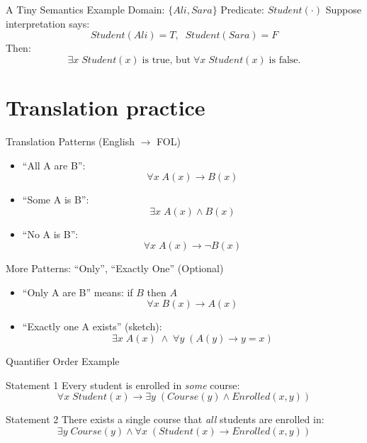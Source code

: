 \documentclass[aspectratio=169]{beamer}
\begin{document}
\begin{frame}{A Tiny Semantics Example}
  Domain: $\{Ali, Sara\}$ \quad Predicate: $Student(\cdot)$
  \vspace{0.4em}
  Suppose interpretation says:
  \[
    Student(Ali)=T,\;\; Student(Sara)=F
  \]
  Then:
  \[
    \exists x\; Student(x)\; \text{is true, but}\; \forall x\; Student(x)\; \text{is false.}
  \]
\end{frame}

\section{Translation practice}
\label{sec:translate}

\begin{frame}{Translation Patterns (English $\rightarrow$ FOL)}
  \begin{itemize}[<+->]
    \item ``All A are B'':
    \[
      \forall x\; A(x) \rightarrow B(x)
    \]
    \item ``Some A is B'':
    \[
      \exists x\; A(x) \land B(x)
    \]
    \item ``No A is B'':
    \[
      \forall x\; A(x) \rightarrow \lnot B(x)
    \]
  \end{itemize}
\end{frame}

\begin{frame}{More Patterns: ``Only'', ``Exactly One'' (Optional)}
  \begin{itemize}[<+->]
    \item ``Only A are B'' means: if $B$ then $A$
    \[
      \forall x\; B(x) \rightarrow A(x)
    \]
    \item ``Exactly one A exists'' (sketch):
    \[
      \exists x\; A(x)\; \land\; \forall y\; (A(y) \rightarrow y=x)
    \]
  \end{itemize}
\end{frame}

\begin{frame}{Quantifier Order Example}
  \begin{block}{Statement 1}
    Every student is enrolled in \emph{some} course:
    \[
      \forall x\; Student(x) \rightarrow \exists y\; (Course(y) \land Enrolled(x,y))
    \]
  \end{block}
  \vspace{0.4em}
  \begin{block}{Statement 2}
    There exists a single course that \emph{all} students are enrolled in:
    \[
      \exists y\; Course(y) \land \forall x\; (Student(x) \rightarrow Enrolled(x,y))
    \]
  \end{block}
\end{frame}
\end{document}
